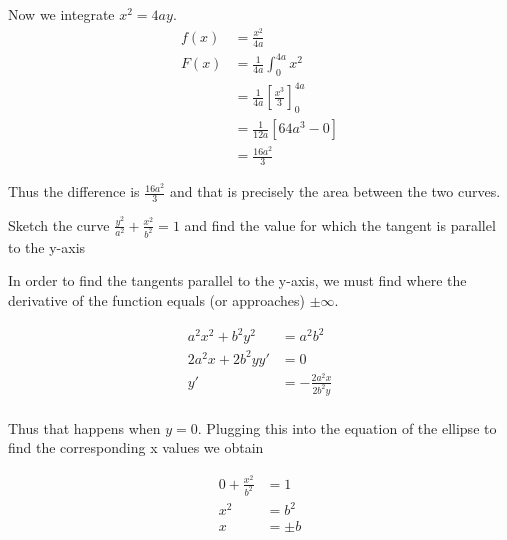 \documentclass[a4paper]{article}
\begin{document}
Now we integrate \(x^2 = 4ay\).
\begin{align*}
	f(x) &= \frac{x^2}{4a} \\
	F(x) &= \frac{1}{4a} \int_0^{4a} x^2 \\
		&= \frac{1}{4a} \left[\frac{x^3}{3}\right]^{4a} _0 \\
		&= \frac{1}{12a} [64a^3 - 0] \\
		&= \frac{16a^2}{3}
\end{align*}

Thus the difference is \(\frac{16a^2}{3}\) and that is precisely the area between the two curves.

\begin{question}
	Sketch the curve \(\frac{y^2}{a^2} + \frac{x^2}{b^2} = 1\) and find the value for which the tangent is parallel to the y-axis
\end{question}

\begin{center}
\end{center}

In order to find the tangents parallel to the y-axis, we must find where the derivative of the function equals (or approaches) \(\pm\infty\).

\begin{align*}
	a^2x^2 + b^2y^2 &= a^2b^2 \\
	2a^2x + 2b^2yy' &= 0 \\
	y' &= -\frac{2a^2x}{2b^2y} \\
\end{align*}

Thus that happens when \(y =0\). Plugging this into the equation of the ellipse to find the corresponding x values we obtain 

\begin{align*}
	0 + \frac{x^2}{b^2} &= 1 \\
	x^2 &= b^2 \\
	x &= \pm b \\
\end{align*}
\end{document}
